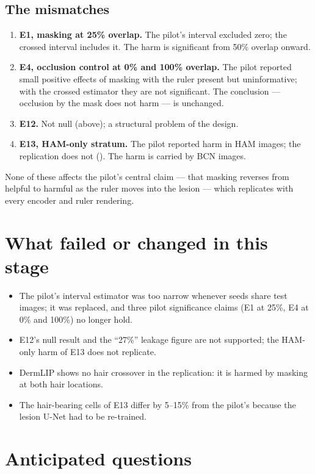 \subsection{The mismatches}\label{sec:mismatch}
\begin{enumerate}[leftmargin=*]\itemsep1pt
\item \textbf{E1, masking at 25\% overlap.} The pilot's interval excluded zero; the crossed interval includes it. The
harm is significant from 50\% overlap onward.
\item \textbf{E4, occlusion control at 0\% and 100\% overlap.} The pilot reported small positive effects of masking
with the ruler present but uninformative; with the crossed estimator they are not significant. The conclusion ---
occlusion by the mask does not harm --- is unchanged.
\item \textbf{E12.} Not null (above); a structural problem of the design.
\item \textbf{E13, HAM-only stratum.} The pilot reported harm in HAM images; the replication does not
(\sOneSrcdinoHAM). The harm is carried by BCN images.
\end{enumerate}
None of these affects the pilot's central claim --- that masking reverses from helpful to harmful as the ruler moves
into the lesion --- which replicates with every encoder and ruler rendering.

\section{What failed or changed in this stage}
\begin{itemize}[leftmargin=*]\itemsep1pt
\item The pilot's interval estimator was too narrow whenever seeds share test images; it was replaced, and three pilot
significance claims (E1 at 25\%, E4 at 0\% and 100\%) no longer hold.
\item E12's null result and the ``27\%'' leakage figure are not supported; the HAM-only harm of E13 does not replicate.
\item DermLIP shows no hair crossover in the replication: it is harmed by masking at both hair locations.
\item The hair-bearing cells of E13 differ by 5--15\% from the pilot's because the lesion U-Net had to be re-trained.
\end{itemize}

\section{Anticipated questions}

